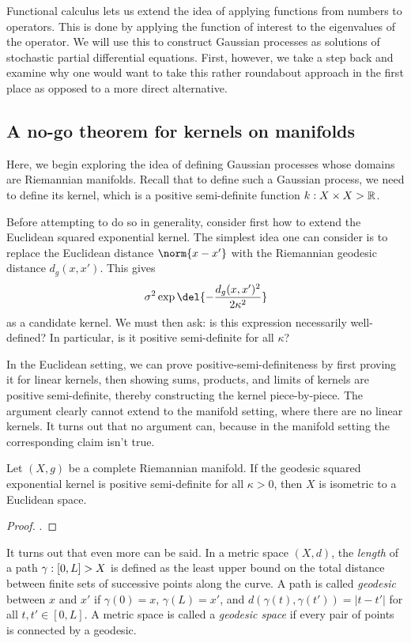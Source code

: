 \documentclass[11pt]{book}
\begin{document}
Functional calculus lets us extend the idea of applying functions from numbers to operators.
This is done by applying the function of interest to the eigenvalues of the operator.
We will use this to construct Gaussian processes as solutions of stochastic partial differential equations.
First, however, we take a step back and examine why one would want to take this rather roundabout approach in the first place as opposed to a more direct alternative.

\subsection{A no-go theorem for kernels on manifolds}

Here, we begin exploring the idea of defining Gaussian processes whose domains are Riemannian manifolds.
Recall that to define such a Gaussian process, we need to define its kernel, which is a positive semi-definite function $k : X \times X \-> \mathbb{R}$.

Before attempting to do so in generality, consider first how to extend the Euclidean squared exponential kernel.
The simplest idea one can consider is to replace the Euclidean distance $\norm{x-x'}$ with the Riemannian geodesic distance $d_g(x,x')$.
This gives 
\[
\sigma^2 \exp\del{-\frac{d_g(x,x')^2}{2\kappa^2}}
\]
as a candidate kernel.
We must then ask: is this expression necessarily well-defined? 
In particular, is it positive semi-definite for all $\kappa$?

In the Euclidean setting, we can prove positive-semi-definiteness by first proving it for linear kernels, then showing sums, products, and limits of kernels are positive semi-definite, thereby constructing the kernel piece-by-piece.
The argument clearly cannot extend to the manifold setting, where there are no linear kernels.
It turns out that no argument can, because in the manifold setting the corresponding claim isn't true.

\begin{result}
Let $(X,g)$ be a complete Riemannian manifold.
If the geodesic squared exponential kernel is positive semi-definite for all $\kappa > 0$, then $X$ is isometric to a Euclidean space.
\end{result}

\begin{proof}
\textcite[Theorem 2]{feragen15}.
\end{proof}

It turns out that even more can be said.
In a metric space $(X,d)$, the \emph{length} of a path  $\gamma : [0,L] \-> X$ is defined as the least upper bound on the total distance between finite sets of successive points along the curve.
A path is called \emph{geodesic} between $x$ and $x'$ if $\gamma(0) = x$, $\gamma(L) = x'$, and $d(\gamma(t),\gamma(t')) = |t - t'|$ for all $t,t'\in[0,L]$.
A metric space is called a \emph{geodesic space} if every pair of points is connected by a geodesic.
\end{document}
